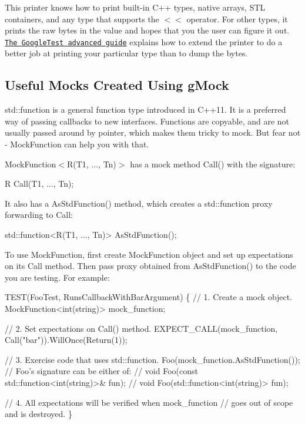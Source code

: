 This printer knows how to print built-\/in C++ types, native arrays, S\+TL containers, and any type that supports the {\ttfamily $<$$<$} operator. For other types, it prints the raw bytes in the value and hopes that you the user can figure it out. \href{advanced.md#teaching-googletest-how-to-print-your-values}{\tt The Google\+Test advanced guide} explains how to extend the printer to do a better job at printing your particular type than to dump the bytes.

\subsection*{Useful Mocks Created Using g\+Mock}

{\ttfamily std\+::function} is a general function type introduced in C++11. It is a preferred way of passing callbacks to new interfaces. Functions are copyable, and are not usually passed around by pointer, which makes them tricky to mock. But fear not -\/ {\ttfamily Mock\+Function} can help you with that.

{\ttfamily Mock\+Function$<$R(T1, ..., Tn)$>$} has a mock method {\ttfamily Call()} with the signature\+:


\begin{DoxyCode}
R Call(T1, ..., Tn);
\end{DoxyCode}


It also has a {\ttfamily As\+Std\+Function()} method, which creates a {\ttfamily std\+::function} proxy forwarding to Call\+:


\begin{DoxyCode}
std::function<R(T1, ..., Tn)> AsStdFunction();
\end{DoxyCode}


To use {\ttfamily Mock\+Function}, first create {\ttfamily Mock\+Function} object and set up expectations on its {\ttfamily Call} method. Then pass proxy obtained from {\ttfamily As\+Std\+Function()} to the code you are testing. For example\+:


\begin{DoxyCode}
TEST(FooTest, RunsCallbackWithBarArgument) \{
  \textcolor{comment}{// 1. Create a mock object.}
  MockFunction<int(string)> mock\_function;

  \textcolor{comment}{// 2. Set expectations on Call() method.}
  EXPECT\_CALL(mock\_function, Call(\textcolor{stringliteral}{"bar"})).WillOnce(Return(1));

  \textcolor{comment}{// 3. Exercise code that uses std::function.}
  Foo(mock\_function.AsStdFunction());
  \textcolor{comment}{// Foo's signature can be either of:}
  \textcolor{comment}{// void Foo(const std::function<int(string)>& fun);}
  \textcolor{comment}{// void Foo(std::function<int(string)> fun);}

  \textcolor{comment}{// 4. All expectations will be verified when mock\_function}
  \textcolor{comment}{//     goes out of scope and is destroyed.}
\}
\end{DoxyCode}


